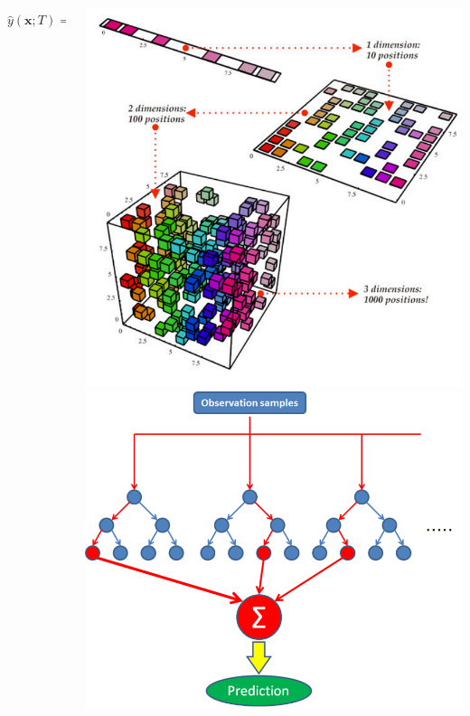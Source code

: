\documentclass{beamer}
\begin{document}
\begin{frame}
\begin{itemize}
\begin{columns}[onlytextwidth]
\begin{column}{0.65\textwidth}
		 					{\small$$
		 					\hat{y}(\bm{x}; T)  = \frac{1}{|T|}\sum_i T_i(low\_dim(\bm{x}))
		 					$$}
		 				
					 	\end{column}
					 	\begin{column}{0.35\textwidth}
					 		\includegraphics[scale=0.08]{img/reduce_dim.png}
					 		\includegraphics[scale=0.09]{img/random_forest.png}					 	
					 	\end{column}
					\end{columns}
				

\end{itemize}
\end{frame}
\end{document}
